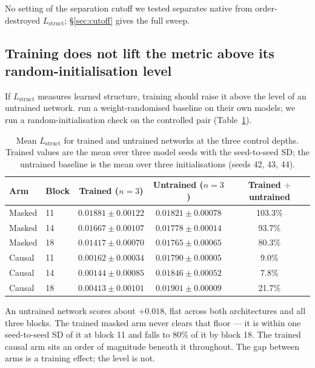 \documentclass{article} %
\newcommand{\Lstruct}{\ensuremath{L_{\mathrm{struct}}}}
\begin{document}
No setting of the separation cutoff we tested separates native from order-destroyed \Lstruct;
\S\ref{sec:cutoff} gives the full sweep.

\subsection{Training does not lift the metric above its random-initialisation level}
\label{sec:randominit}

If \Lstruct{} measures learned structure, training should raise it above the level of an untrained
network. \citet{simon2025interplm} run a weight-randomised baseline on their own models; we run a
random-initialisation check on the controlled pair (Table~\ref{tab:untrained}).

\begin{table}[t]
\caption{Mean \Lstruct{} for trained and untrained networks at the three control depths. Trained
values are the mean over three model seeds with the seed-to-seed SD; the untrained baseline is the
mean over three initialisations (seeds 42, 43, 44).}
\label{tab:untrained}
\begin{center}
\begin{tabular}{llccc}
\toprule
Arm & Block & Trained ($n = 3$) & Untrained ($n = 3$) & Trained $\div$ untrained \\
\midrule
Masked & 11 & $0.01881 \pm 0.00122$ & $0.01821 \pm 0.00078$ & 103.3\% \\
Masked & 14 & $0.01667 \pm 0.00107$ & $0.01778 \pm 0.00014$ & 93.7\% \\
Masked & 18 & $0.01417 \pm 0.00070$ & $0.01765 \pm 0.00065$ & 80.3\% \\
\midrule
Causal & 11 & $0.00162 \pm 0.00034$ & $0.01790 \pm 0.00005$ & 9.0\% \\
Causal & 14 & $0.00144 \pm 0.00085$ & $0.01846 \pm 0.00052$ & 7.8\% \\
Causal & 18 & $0.00413 \pm 0.00101$ & $0.01901 \pm 0.00009$ & 21.7\% \\
\bottomrule
\end{tabular}
\end{center}
\end{table}

An untrained network scores about $+0.018$, flat across both architectures and all three blocks.
The trained masked arm never clears that floor --- it is within one seed-to-seed SD of it at block
11 and falls to 80\% of it by block 18. The trained causal arm sits an order of magnitude beneath
it throughout. The gap between arms is a training effect; the level is not.
\end{document}
